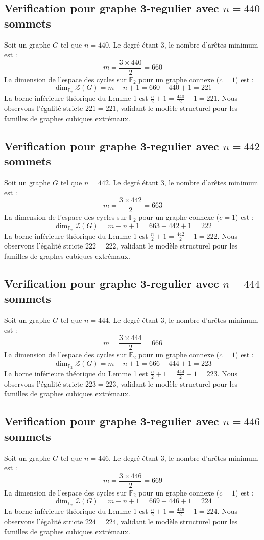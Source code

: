 \documentclass[11pt,a4paper]{article}
\begin{document}
\subsection{Verification pour graphe 3-regulier avec $n=440$ sommets}
Soit un graphe $G$ tel que $n = 440$. Le degré étant 3, le nombre d'arêtes minimum est :
$$ m = \frac{3 \times 440}{2} = 660 $$
La dimension de l'espace des cycles sur $\mathbb{F}_2$ pour un graphe connexe ($c=1$) est :
$$ \dim_{\mathbb{F}_2} \mathcal{Z}(G) = m - n + 1 = 660 - 440 + 1 = 221 $$
La borne inférieure théorique du Lemme 1 est $\frac{n}{2} + 1 = \frac{440}{2} + 1 = 221$.
Nous observons l'égalité stricte $221 = 221$, validant le modèle structurel pour les familles de graphes cubiques extrémaux.

\subsection{Verification pour graphe 3-regulier avec $n=442$ sommets}
Soit un graphe $G$ tel que $n = 442$. Le degré étant 3, le nombre d'arêtes minimum est :
$$ m = \frac{3 \times 442}{2} = 663 $$
La dimension de l'espace des cycles sur $\mathbb{F}_2$ pour un graphe connexe ($c=1$) est :
$$ \dim_{\mathbb{F}_2} \mathcal{Z}(G) = m - n + 1 = 663 - 442 + 1 = 222 $$
La borne inférieure théorique du Lemme 1 est $\frac{n}{2} + 1 = \frac{442}{2} + 1 = 222$.
Nous observons l'égalité stricte $222 = 222$, validant le modèle structurel pour les familles de graphes cubiques extrémaux.

\subsection{Verification pour graphe 3-regulier avec $n=444$ sommets}
Soit un graphe $G$ tel que $n = 444$. Le degré étant 3, le nombre d'arêtes minimum est :
$$ m = \frac{3 \times 444}{2} = 666 $$
La dimension de l'espace des cycles sur $\mathbb{F}_2$ pour un graphe connexe ($c=1$) est :
$$ \dim_{\mathbb{F}_2} \mathcal{Z}(G) = m - n + 1 = 666 - 444 + 1 = 223 $$
La borne inférieure théorique du Lemme 1 est $\frac{n}{2} + 1 = \frac{444}{2} + 1 = 223$.
Nous observons l'égalité stricte $223 = 223$, validant le modèle structurel pour les familles de graphes cubiques extrémaux.

\subsection{Verification pour graphe 3-regulier avec $n=446$ sommets}
Soit un graphe $G$ tel que $n = 446$. Le degré étant 3, le nombre d'arêtes minimum est :
$$ m = \frac{3 \times 446}{2} = 669 $$
La dimension de l'espace des cycles sur $\mathbb{F}_2$ pour un graphe connexe ($c=1$) est :
$$ \dim_{\mathbb{F}_2} \mathcal{Z}(G) = m - n + 1 = 669 - 446 + 1 = 224 $$
La borne inférieure théorique du Lemme 1 est $\frac{n}{2} + 1 = \frac{446}{2} + 1 = 224$.
Nous observons l'égalité stricte $224 = 224$, validant le modèle structurel pour les familles de graphes cubiques extrémaux.
\end{document}
